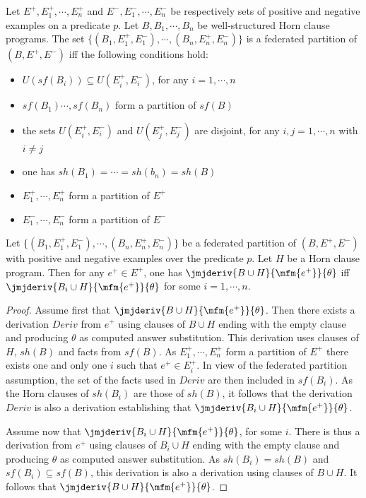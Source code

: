 \begin{definition}
Let $E^+, E_1^+, \cdots, E_n^+$ and $E^-, E_1^-, \cdots, E_n^-$ be respectively sets of positive and negative examples on a predicate $p$. Let $B, B_1, \cdots, B_n$ be well-structured Horn clause programs. The set 
\( \{ (B_1, E_1^+,E_1^-), \cdots, (B_n, E_n^+,E_n^-) \}
\)
is a federated partition of $(B, E^+,E^-)$ iff the following conditions hold:

\begin{itemize}
\item $U(sf(B_i)) \subseteq U(E_i^+,E_i^-)$, for any $i=1, \cdots, n$
\item $sf(B_1) \cdots, sf(B_n)$ form a partition of $sf(B)$
\item the sets $U(E_i^+,E_i^-)$ and $U(E_j^+,E_j^-)$ are disjoint, for any 
      $i,j=1, \cdots, n$ with $i \not= j$
\item one has $sh(B_1) = \cdots = sh(b_n) = sh(B)$
\item $E_1^+, \cdots, E_n^+$ form a partition of $E^+$
\item $E_1^-, \cdots, E_n^-$ form a partition of $E^-$
\end{itemize}
\end{definition}

\begin{proposition}
\label{key-prop-pos}
Let \( \{ (B_1, E_1^+,E_1^-), \cdots, (B_n, E_n^+,E_n^-) \}
\)
be a federated partition of $(B, E^+,E^-)$ with positive and negative examples over the predicate $p$. Let $H$ be a Horn clause program. Then for any $e^+ \in E^+$, one has  \( \jmjderiv{B \cup H}{\mfm{e^+}}{\theta} \) iff 
\( \jmjderiv{B_i \cup H}{\mfm{e^+}}{\theta} \) for some $i=1, \cdots, n$.
\end{proposition}


\begin{proof}
Assume first that \( \jmjderiv{B \cup H}{\mfm{e^+}}{\theta} \). Then there exists a derivation $Deriv$ from $e^+$ using clauses of $B \cup H$ ending with the empty clause and producing $\theta$ as computed answer substitution. This derivation uses clauses of $H$, $sh(B)$ and facts from $sf(B)$. As $E_1^+, \cdots, E_n^+$ form a partition of $E^+$ there exists one and only one $i$ such that $e^+ \in E_i^+$. In view of the federated partition assumption, the set of the facts used in $Deriv$ are then included in $sf(B_i)$. As the Horn clauses of $sh(B_i)$ are those of $sh(B)$, it follows that the derivation $Deriv$ is also a derivation establishing that \( \jmjderiv{B_i \cup H}{\mfm{e^+}}{\theta} \). 

Assume now that  \( \jmjderiv{B_i \cup H}{\mfm{e^+}}{\theta} \), for some $i$. There is thus a derivation from $e^+$ using clauses of $B_i \cup H$ ending with the empty clause and producing $\theta$ as computed answer substitution. As $sh(B_i) = sh(B)$ and $sf(B_i) \subseteq sf(B)$, this derivation is also a derivation using clauses of $B \cup H$. It follows that \( \jmjderiv{B \cup H}{\mfm{e^+}}{\theta} \).
\end{proof}

